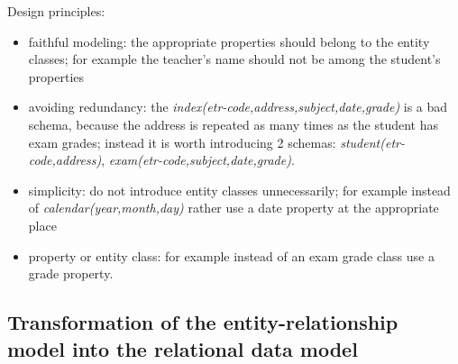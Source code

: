 \documentclass[margin=0px]{article}
\begin{document}
Design principles:
\begin{itemize}
    \item faithful modeling: the appropriate properties should belong to the entity classes; for example the teacher's name should not be among the student's properties
    \item avoiding redundancy: the \textit{index(etr-code,address,subject,date,grade)} is a bad schema,
          because the address is repeated as many times as the student has exam grades; instead it is worth introducing 2 schemas: \textit{student(etr-code,address)}, \textit{exam(etr-code,subject,date,grade)}.
    \item simplicity: do not introduce entity classes unnecessarily; for example instead of \textit{calendar(year,month,day)} rather use a date property at the appropriate place
    \item property or entity class: for example instead of an exam grade class use a grade property.
\end{itemize}

\subsection{Transformation of the entity-relationship model into the relational data model}
\end{document}
